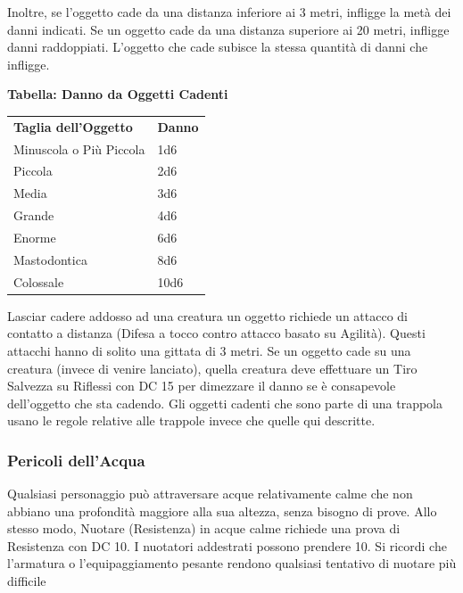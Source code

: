 \documentclass[a4paper,11pt,twoside,openany]{book}
\begin{document}
Inoltre, se l'oggetto cade da una distanza inferiore ai 3 metri, infligge la metà dei danni indicati. Se un oggetto cade da una distanza superiore ai 20 metri, infligge danni raddoppiati. L'oggetto che cade subisce la stessa quantità di danni che infligge.

\bigskip

\textbf{Tabella: Danno da Oggetti Cadenti}

\begin{tabular}{ll}
	\toprule
	\textbf{Taglia dell'Oggetto} & \textbf{Danno}\\
	Minuscola o Più Piccola      & 1d6\\
	Piccola                      & 2d6\\
	Media                        & 3d6\\
	Grande                       & 4d6\\
	Enorme                       & 6d6\\
	Mastodontica                 & 8d6\\
	Colossale                    & 10d6\\
\end{tabular}

\bigskip

Lasciar cadere addosso ad una creatura un oggetto richiede un attacco di contatto a distanza (Difesa a tocco contro attacco basato su Agilità). Questi attacchi hanno di solito una gittata di 3 metri. Se un oggetto cade su una creatura (invece di venire lanciato), quella creatura deve effettuare un Tiro Salvezza su Riflessi con DC 15 per dimezzare il danno se è consapevole dell'oggetto che sta cadendo. Gli oggetti cadenti che sono parte di una trappola usano le regole relative alle trappole invece che quelle qui descritte.

\subsubsection{Pericoli dell'Acqua}

\label{pericoli-dellacqua}

Qualsiasi personaggio può attraversare acque relativamente calme che non abbiano una profondità maggiore alla sua altezza, senza bisogno di prove. Allo stesso modo, Nuotare (Resistenza) in acque calme richiede una prova di Resistenza con DC 10. I nuotatori addestrati possono prendere 10. Si ricordi che l'armatura o l'equipaggiamento pesante rendono qualsiasi tentativo di nuotare più difficile
\end{document}
